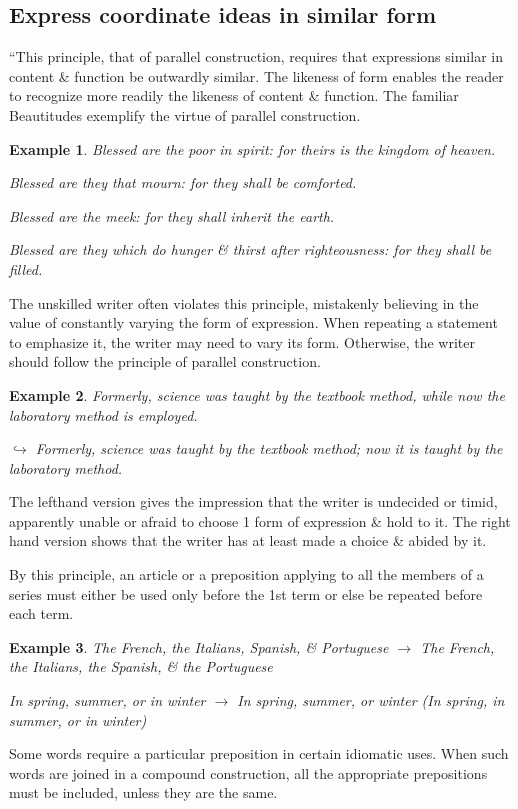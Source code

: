 \documentclass[oneside]{book}
\numberwithin{equation}{section}
\newtheorem{example}{Example}[chapter]
\begin{document}
\subsection{Express coordinate ideas in similar form}
``This principle, that of parallel construction, requires that expressions similar in content \& function be outwardly similar. The likeness of form enables the reader to recognize more readily the likeness of content \& function. The familiar Beautitudes exemplify the virtue of parallel construction.

\begin{example}
	Blessed are the poor in spirit: for theirs is the kingdom of heaven.
	
	Blessed are they that mourn: for they shall be comforted.
	
	Blessed are the meek: for they shall inherit the earth.
	
	Blessed are they which do hunger \& thirst after righteousness: for they shall be filled.
\end{example}
The unskilled writer often violates this principle, mistakenly believing in the value of constantly varying the form of expression. When repeating a statement to emphasize it, the writer may need to vary its form. Otherwise, the writer should follow the principle of parallel construction.

\begin{example}
	Formerly, science was taught by the textbook method, while now the laboratory method is employed.
	
	$\hookrightarrow$ Formerly, science was taught by the textbook method; now it is taught by the laboratory method.
\end{example}
The lefthand version gives the impression that the writer is undecided or timid, apparently unable or afraid to choose 1 form of expression \& hold to it. The right hand version shows that the writer has at least made a choice \& abided by it.

By this principle, an article or a preposition applying to all the members of a series must either be used only before the 1st term or else be repeated before each term.

\begin{example}
	The French, the Italians, Spanish, \& Portuguese $\to$ The French, the Italians, the Spanish, \& the Portuguese
	
	In spring, summer, or in winter $\to$ In spring, summer, or winter (In spring, in summer, or in winter)
\end{example}
Some words require a particular preposition in certain idiomatic uses. When such words are joined in a compound construction, all the appropriate prepositions must be included, unless they are the same.
\end{document}
